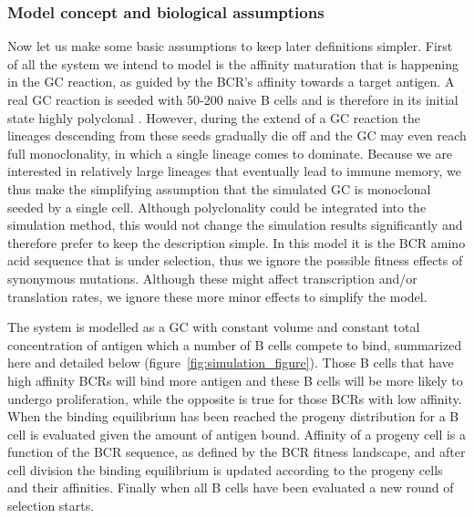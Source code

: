 \subsubsection{Model concept and biological assumptions}
Now let us make some basic assumptions to keep later definitions simpler.
First of all the system we intend to model is the affinity maturation that is happening in the GC reaction, as guided by the BCR's affinity towards a target antigen.
A real GC reaction is seeded with 50-200 naive B cells and is therefore in its initial state highly polyclonal \cite{tas2016visualizing}.
However, during the extend of a GC reaction the lineages descending from these seeds gradually die off \cite{tas2016visualizing} and the GC may even reach full monoclonality, in which a single lineage comes to dominate.
Because we are interested in relatively large lineages that eventually lead to immune memory, we thus make the simplifying assumption that the simulated GC is monoclonal seeded by a single cell.
Although polyclonality could be integrated into the simulation method, this would not change the simulation results significantly and therefore prefer to keep the description simple.
In this model it is the BCR amino acid sequence that is under selection, thus we ignore the possible fitness effects of synonymous mutations.
Although these might affect transcription and/or translation rates, we ignore these more minor effects to simplify the model.

The system is modelled as a GC with constant volume and constant total concentration of antigen which a number of B cells compete to bind, summarized here and detailed below (figure~\ref{fig:simulation_figure}).
Those B cells that have high affinity BCRs will bind more antigen and these B cells will be more likely to undergo proliferation, while the opposite is true for those BCRs with low affinity.
When the binding equilibrium has been reached the progeny distribution for a B cell is evaluated given the amount of antigen bound.
Affinity of a progeny cell is a function of the BCR sequence, as defined by the BCR fitness landscape, and after cell division the binding equilibrium is updated according to the progeny cells and their affinities.
Finally when all B cells have been evaluated a new round of selection starts.

